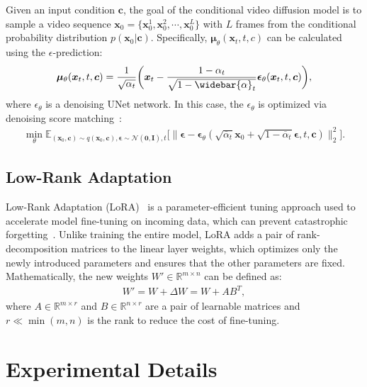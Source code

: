\documentclass{article} %
\def\x{{\bm{x}}}
\def\c{{\bm{c}}}
\def\I{{\bm{I}}}
\begin{document}
Given an input condition $\c$, the goal of the conditional video diffusion model is to sample a video sequence $\x_0=\{\x_0^1,\x_0^2,\cdots,\x_0^L\}$ with $L$ frames from the conditional probability distribution $p(\x_0|\c)$. Specifically, $\bm{\mu}_\theta(\x_t, t, c)$ can be calculated using the $\epsilon$-prediction:
\begin{align}
\bm{\mu}_\theta(\x_t, t, \c) = \frac{1}{\sqrt{\alpha_t}}\bigg(\x_{t} - \frac{1-\alpha_t}{\sqrt{1-\widebar{\alpha}_t}}{\bm \epsilon}_\theta(\x_{t}, t, \c)\bigg),
\end{align}
where $\epsilon_\theta$ is a denoising UNet network. In this case, the $\epsilon_\theta$   is optimized via denoising score matching~\citep{song2019generative}:
\begin{align}
\min_{\theta} \mathbb{E}_{(\x_{0}, \c) \sim q(\x_{0}, \c), {\bm \epsilon} \sim \mathcal{N}(\bm{0}, \I), t}\big[\|{\bm \epsilon} - {\bm \epsilon}_{\theta}(\sqrt{\overline{\alpha}_t}\x_{0} + \sqrt{1-\overline{\alpha}_t}{\bm \epsilon}, t, \c)\|_2^2\big].
\end{align}
\subsection{Low-Rank Adaptation}
Low-Rank Adaptation (LoRA)~\citep{lora} is a parameter-efficient tuning approach used to accelerate model fine-tuning on incoming data, which can prevent catastrophic forgetting~\citep{ren2024analyzing}. Unlike training the entire model, LoRA adds a pair of rank-decomposition matrices to the linear layer weights, which optimizes only the newly introduced parameters and ensures that the other parameters are fixed. Mathematically, the new weights $W'\in\mathbb{R}^{m\times n}$ can be defined as:
\begin{align}
W'= W + \Delta W=W+AB^T,
\end{align}
where $A\in \mathbb{R}^{m \times r}$ and $B\in \mathbb{R}^{n \times r}$ are a pair of learnable matrices and $r \ll \min(m,n)$ is the rank to reduce the cost of fine-tuning.

\section{Experimental Details}
\end{document}
